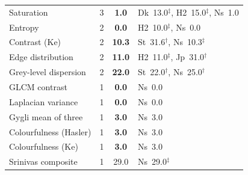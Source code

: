 \begin{table}[!ht]
\begin{tabular}{@{}>{\raggedright\arraybackslash}p{3.4cm}cc>{\raggedright\arraybackslash}p{5.6cm}@{}}
Saturation & 3 & \textcolor{accentred}{\textbf{1.0}} & Dk~13.0$^{\ddagger}$, H2~15.0$^{\ddagger}$, Ns~1.0 \\
\rowcolor{rowlight}Entropy & 2 & \textcolor{accentred}{\textbf{0.0}} & H2~10.0$^{\ddagger}$, Ns~0.0 \\
Contrast (Ke) & 2 & \textcolor{accentred}{\textbf{10.3}} & St~31.6$^{\dagger}$, Ns~10.3$^{\ddagger}$ \\
\rowcolor{rowlight}Edge distribution & 2 & \textcolor{accentred}{\textbf{11.0}} & H2~11.0$^{\ddagger}$, Jp~31.0$^{\dagger}$ \\
Grey-level dispersion & 2 & \textcolor{accentred}{\textbf{22.0}} & St~22.0$^{\dagger}$, Ns~25.0$^{\dagger}$ \\
\rowcolor{rowlight}GLCM contrast & 1 & \textcolor{accentred}{\textbf{0.0}} & Ns~0.0 \\
Laplacian variance & 1 & \textcolor{accentred}{\textbf{0.0}} & Ns~0.0 \\
\rowcolor{rowlight}Gygli mean of three & 1 & \textcolor{accentred}{\textbf{3.0}} & Ns~3.0 \\
Colourfulness (Hasler) & 1 & \textcolor{accentred}{\textbf{3.0}} & Ns~3.0 \\
\rowcolor{rowlight}Colourfulness (Ke) & 1 & \textcolor{accentred}{\textbf{3.0}} & Ns~3.0 \\
Srinivas composite & 1 & 29.0 & Ns~29.0$^{\ddagger}$ \\
\bottomrule
\end{tabular}
\end{table}
